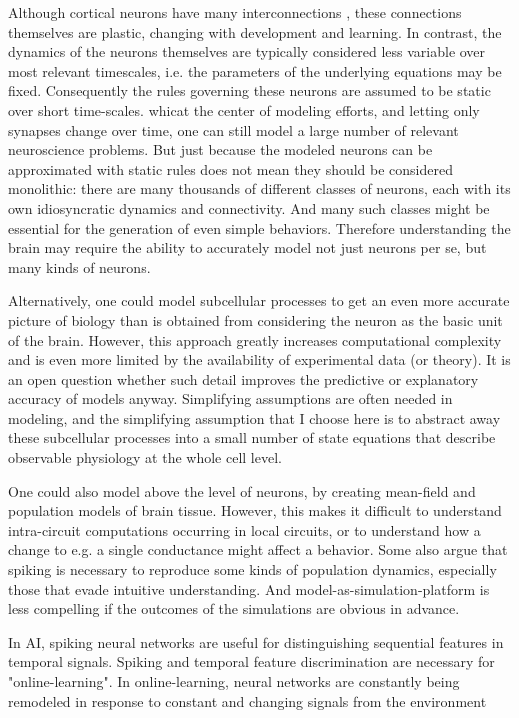 Although cortical neurons have many interconnections \citep{ball2014rich}, these connections themselves are plastic, changing with development and learning.
In contrast, the dynamics of the neurons themselves are typically considered less variable over most relevant timescales, i.e. the parameters of the underlying equations may be fixed.
Consequently the rules governing these neurons are assumed to be static over short time-scales.
whicat the center of modeling efforts, and letting only synapses change over time, one can still model a large number of relevant neuroscience problems.
But just because the modeled neurons can be approximated with static rules does not mean they should be considered monolithic: there are many thousands of different classes of neurons, each with its own idiosyncratic dynamics and connectivity.
And many such classes might be essential for the generation of even simple behaviors.
Therefore understanding the brain may require the ability to accurately model not just neurons per se, but many kinds of neurons.

Alternatively, one could model subcellular processes to get an even more accurate picture of biology than is obtained from considering the neuron as the basic unit of the brain.
However, this approach greatly increases computational complexity and is even more limited by the availability of experimental data (or theory). It is an open question whether such detail improves the predictive or explanatory accuracy of models anyway.
Simplifying assumptions are often needed in modeling, and the simplifying assumption that I choose here is to abstract away these subcellular processes into a small number of state equations that describe observable physiology at the whole cell level.

One could also model above the level of neurons, by creating mean-field and population models of brain tissue.
However, this makes it difficult to understand intra-circuit computations occurring in local circuits, or to understand how a change to e.g. a single conductance might affect a behavior.
Some also argue that spiking is necessary to reproduce some kinds of population dynamics, especially those that evade intuitive understanding.
And model-as-simulation-platform is less compelling if the outcomes of the simulations are obvious in advance.

In AI, spiking neural networks are useful for distinguishing sequential features in temporal signals.
Spiking and temporal feature discrimination are necessary for "online-learning".
In online-learning, neural networks are constantly being remodeled in response to constant and changing signals from the environment



